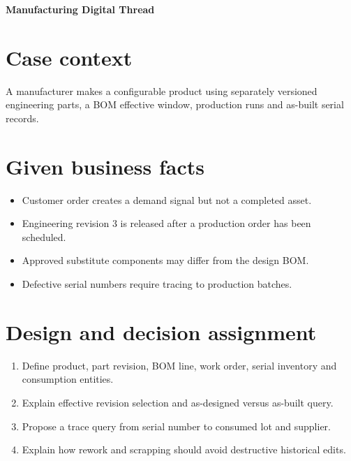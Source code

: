 \documentclass[11pt,letterpaper]{article}
\begin{document}
\begin{center}
{\LARGE\bfseries\color{navy} Manufacturing Digital Thread}\par
\vspace{0.25em}{\large Scenario-based enterprise case study}\par
{}
\end{center}
\vspace{0.8em}
\section{Case context}
A manufacturer makes a configurable product using separately versioned engineering parts, a BOM effective window, production runs and as-built serial records.


\section{Given business facts}
\begin{itemize}
\item Customer order creates a demand signal but not a completed asset.
\item Engineering revision 3 is released after a production order has been scheduled.
\item Approved substitute components may differ from the design BOM.
\item Defective serial numbers require tracing to production batches.
\end{itemize}

\section{Design and decision assignment}
\begin{enumerate}
\item Define product, part revision, BOM line, work order, serial inventory and consumption entities.
\item Explain effective revision selection and as-designed versus as-built query.
\item Propose a trace query from serial number to consumed lot and supplier.
\item Explain how rework and scrapping should avoid destructive historical edits.
\end{enumerate}
\end{document}
